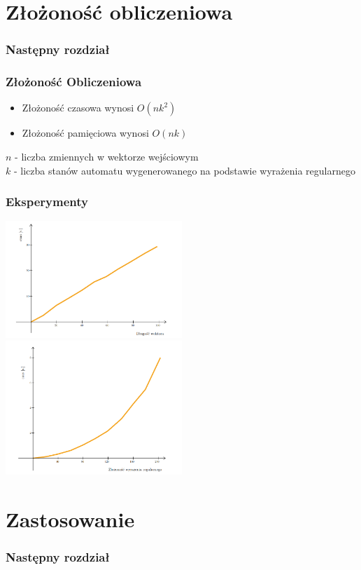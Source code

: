 \documentclass{beamer}
\begin{document}
    \section{Złożoność obliczeniowa}
    \begin{frame}
		\frametitle{Następny rozdział}
        \tableofcontents[currentsection]
    \end{frame}
    \begin{frame}
    	\frametitle{Złożoność Obliczeniowa}
        \begin{itemize}
            \item Złożoność czasowa wynosi $O(nk^2)$
            \item Złożoność pamięciowa wynosi $O(nk)$
        \end{itemize}
        $n$ - liczba zmiennych w wektorze wejściowym \\
        $k$ - liczba stanów automatu wygenerowanego na podstawie wyrażenia regularnego
    \end{frame}
    \begin{frame}
        \frametitle{Eksperymenty}
        \begin{center}
            \includegraphics[width=0.5\textwidth]{vec_len.png}
            \includegraphics[width=0.5\textwidth]{vec_complex.png}
        \end{center}
    \end{frame}


    \section{Zastosowanie}
    \begin{frame}
		\frametitle{Następny rozdział}
        \tableofcontents[currentsection]
    \end{frame}
    
\end{document}
